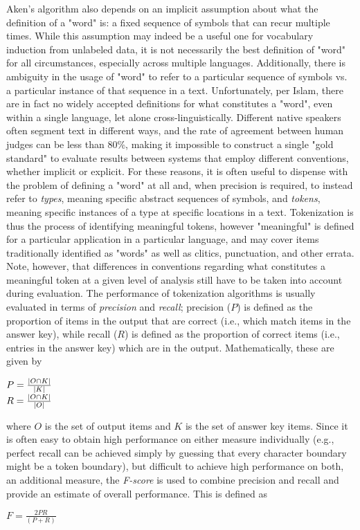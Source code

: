 Aken's algorithm also depends on an implicit assumption about what the definition of a "word" is: a fixed sequence of symbols that can recur multiple times. While this assumption may indeed be a useful one for vocabulary induction from unlabeled data, it is not necessarily the best definition of "word" for all circumstances, especially across multiple languages. Additionally, there is ambiguity in the usage of "word" to refer to a particular sequence of symbols vs. a particular instance of that sequence in a text. Unfortunately, per Islam\cite{islam07}, there are in fact no widely accepted definitions for what constitutes a "word", even within a single language, let alone cross-linguistically. Different native speakers often segment text in different ways, and the rate of agreement between human judges can be less than 80\%, making it impossible to construct a single "gold standard" to evaluate results between systems that employ different conventions, whether implicit or explicit.
For these reasons, it is often useful to dispense with the problem of defining a "word" at all and, when precision is required, to instead refer to \textit{types}, meaning specific abstract sequences of symbols, and \textit{tokens}, meaning specific instances of a type at specific locations in a text. Tokenization is thus the process of identifying meaningful tokens, however "meaningful" is defined for a particular application in a particular language, and may cover items traditionally identified as "words" as well as clitics, punctuation, and other errata. Note, however, that differences in conventions regarding what constitutes a meaningful token at a given level of analysis still have to be taken into account during evaluation. The performance of tokenization algorithms is usually evaluated in terms of \textit{precision} and \textit{recall}; precision ($P$) is defined as the proportion of items in the output that are correct (i.e., which match items in the answer key), while recall ($R$) is defined as the proportion of correct items (i.e., entries in the answer key) which are in the output. Mathematically, these are given by
\begin{center}
	$P = \frac{\left|O \cap K\right|}{\left|K\right|}$ \\
	$R = \frac{\left|O \cap K\right|}{\left|O\right|}$
\end{center}
where $O$ is the set of output items and $K$ is the set of answer key items. Since it is often easy to obtain high performance on either measure individually (e.g., perfect recall can be achieved simply by guessing that every character boundary might be a token boundary), but difficult to achieve high performance on both, an additional measure, the \textit{F-score} is used to combine precision and recall and provide an estimate of overall performance. This is defined as
\begin{center}
	$F = \frac{2PR}{(P + R)}$
\end{center}

